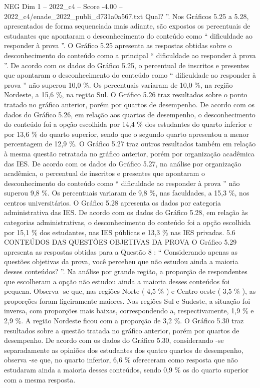 \begin{textsample}{NEG Dim 1 – 2022\_c4 – Score -4.00 – 2022\_c4/enade\_2022\_publi\_d731a0a567.txt}
Qual? ”.
Nos Gráficos 5.25 a 5.28, apresentados de forma sequenciada mais adiante, são expostos os percentuais de estudantes que apontaram o desconhecimento do conteúdo como “ dificuldade ao responder à prova ”.
O Gráfico 5.25 apresenta as respostas obtidas sobre o desconhecimento do conteúdo como a principal “ dificuldade ao responder à prova ”.
De acordo com os dados do Gráfico 5.25, o percentual de inscritos e presentes que apontaram o desconhecimento do conteúdo como “ dificuldade ao responder à prova ” não superou 10,0 \%.
Os percentuais variaram de 10,0 \%, na região Nordeste, a 15,6 \%, na região Sul.
O Gráfico 5.26 traz resultados sobre o ponto tratado no gráfico anterior, porém por quartos de desempenho.
De acordo com os dados do Gráfico 5.26, em relação aos quartos de desempenho, o desconhecimento do conteúdo foi a opção escolhida por 14,4 \% dos estudantes do quarto inferior e por 13,6 \% do quarto superior, sendo que o segundo quarto apresentou a menor percentagem de 12,9 \%.
O Gráfico 5.27 traz outros resultados também em relação à mesma questão retratada no gráfico anterior, porém por organização acadêmica das IES.
De acordo com os dados do Gráfico 5.27, na análise por organização acadêmica, o percentual de inscritos e presentes que apontaram o desconhecimento do conteúdo como “ dificuldade ao responder à prova ” não superou 9,8 \%.
Os percentuais variaram de 9,8 \%, nas faculdades, a 15,3 \%, nos centros universitários.
O Gráfico 5.28 apresenta os dados por categoria administrativa das IES.
De acordo com os dados do Gráfico 5.28, em relação às categorias administrativas, o desconhecimento do conteúdo foi a opção escolhida por 15,1 \% dos estudantes, nas IES públicas e 13,3 \% nas IES privadas. 5.6 CONTEÚDOS DAS QUESTÕES OBJETIVAS DA PROVA O Gráfico 5.29 apresenta as respostas obtidas para a Questão 8 : “ Considerando apenas as questões objetivas da prova, você percebeu que não estudou ainda a maioria desses conteúdos? ”.
Na análise por grande região, a proporção de respondentes que escolheram a opção não estudou ainda a maioria desses conteúdos foi pequena.
Observa -se que, nas regiões Norte ( 4,5 \% ) e Centro-oeste ( 3,5 \% ), as proporções foram ligeiramente maiores.
Nas regiões Sul e Sudeste, a situação foi inversa, com proporções mais baixas, correspondendo a, respectivamente, 1,9 \% e 2,9 \%.
A região Nordeste ficou com a proporção de 3,2 \%.
O Gráfico 5.30 traz resultados sobre a questão tratada no gráfico anterior, porém por quartos de desempenho.
De acordo com os dados do Gráfico 5.30, considerando -se separadamente as opiniões dos estudantes dos quatro quartos de desempenho, observa -se que, no quarto inferior, 6,6 \% ofereceram como resposta que não estudaram ainda a maioria desses conteúdos, sendo 0,9 \% os do quarto superior com a mesma resposta.

\end{textsample}
